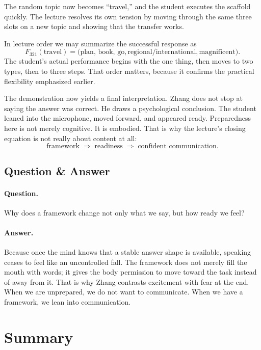 The random topic now becomes ``travel,'' and the student executes the scaffold quickly. The lecture resolves its own tension by moving through the same three slots on a new topic and showing that the transfer works.

In lecture order we may summarize the successful response as
\begin{equation}
F_{321}(\text{travel})
=
\bigl(
\text{plan, book, go},
\text{regional/international},
\text{magnificent}
\bigr).
\end{equation}
The student’s actual performance begins with the one thing, then moves to two types, then to three steps. That order matters, because it confirms the practical flexibility emphasized earlier.

The demonstration now yields a final interpretation. Zhang does not stop at saying the answer was correct. He draws a psychological conclusion. The student leaned into the microphone, moved forward, and appeared ready. Preparedness here is not merely cognitive. It is embodied. That is why the lecture’s closing equation is not really about content at all:
\begin{equation}
\text{framework}
\;\Rightarrow\;
\text{readiness}
\;\Rightarrow\;
\text{confident communication}.
\end{equation}

\subsection{Question \& Answer}

\paragraph{Question.} Why does a framework change not only what we say, but how ready we feel?

\paragraph{Answer.} Because once the mind knows that a stable answer shape is available, speaking ceases to feel like an uncontrolled fall. The framework does not merely fill the mouth with words; it gives the body permission to move toward the task instead of away from it. That is why Zhang contrasts excitement with fear at the end. When we are unprepared, we do not want to communicate. When we have a framework, we lean into communication.

\section{Summary}

